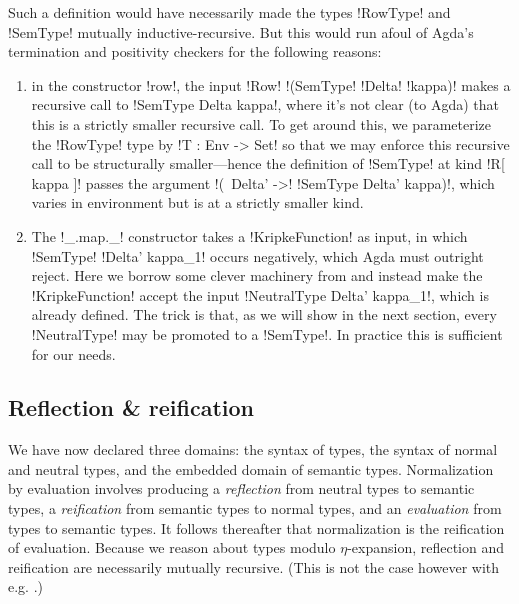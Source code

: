 \documentclass[sigplan,10pt,review]{acmart}\settopmatter{printfolios=true,printccs=false,printacmref=false}
\begin{document}
\Ni Such a definition would have necessarily made the types !RowType! and !SemType! mutually inductive-recursive. But this would run afoul of Agda's termination and positivity checkers for the following reasons:
\begin{enumerate}
  \item in the constructor !row!, the input !Row! !(SemType! !Delta! !kappa)! makes a recursive call to !SemType Delta kappa!, where it's not clear (to Agda) that this is a strictly smaller recursive call. To get around this, we parameterize the !RowType! type by !T : Env -> Set! so that we may enforce this recursive call to be structurally smaller---hence the definition of !SemType! at kind !R[ kappa ]! passes the argument !(\ Delta' ->! !SemType Delta' kappa)!, which varies in environment but is at a strictly smaller kind.
  \item  The !_.map._! constructor takes a !KripkeFunction! as input, in which !SemType! !Delta' kappa_1! occurs negatively, which Agda must outright reject. Here we borrow some clever machinery from \citet{AllaisBM13} and instead make the !KripkeFunction! accept the input !NeutralType Delta' kappa_1!, which is already defined. The trick is that, as we will show in the next section, every !NeutralType! may be promoted to a !SemType!. In practice this is sufficient for our needs.
\end{enumerate}

\subsection{Reflection \& reification}

We have now declared three domains: the syntax of types, the syntax of normal and neutral types, and the embedded domain of semantic types. Normalization by evaluation involves producing a \emph{reflection} from neutral types to semantic types, a \emph{reification} from semantic types to normal types, and an \emph{evaluation} from types to semantic types. It follows thereafter that normalization is the reification of evaluation. Because we reason about types modulo $\eta$-expansion, reflection and reification are necessarily mutually recursive. (This is not the case however with e.g. \citet{ChapmanKNW19}.)
\end{document}
